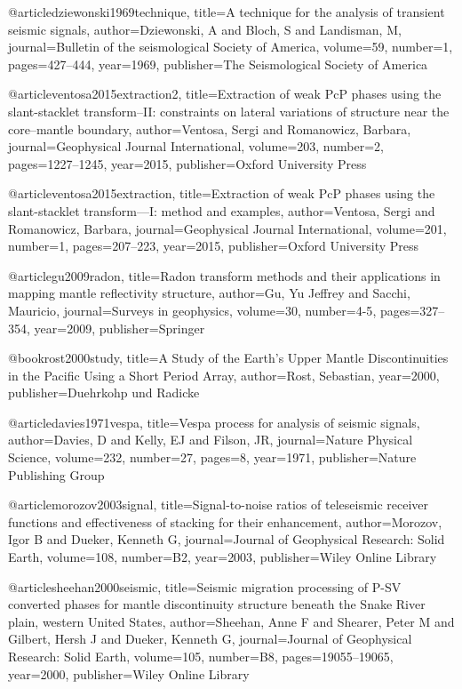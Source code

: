 @article{dziewonski1969technique,
  title={A technique for the analysis of transient seismic signals},
  author={Dziewonski, A and Bloch, S and Landisman, M},
  journal={Bulletin of the seismological Society of America},
  volume={59},
  number={1},
  pages={427--444},
  year={1969},
  publisher={The Seismological Society of America}
}

@article{ventosa2015extraction2,
  title={Extraction of weak PcP phases using the slant-stacklet transform--II: constraints on lateral variations of structure near the core--mantle boundary},
  author={Ventosa, Sergi and Romanowicz, Barbara},
  journal={Geophysical Journal International},
  volume={203},
  number={2},
  pages={1227--1245},
  year={2015},
  publisher={Oxford University Press}
}

@article{ventosa2015extraction,
  title={Extraction of weak PcP phases using the slant-stacklet transform—I: method and examples},
  author={Ventosa, Sergi and Romanowicz, Barbara},
  journal={Geophysical Journal International},
  volume={201},
  number={1},
  pages={207--223},
  year={2015},
  publisher={Oxford University Press}
}

@article{gu2009radon,
  title={Radon transform methods and their applications in mapping mantle reflectivity structure},
  author={Gu, Yu Jeffrey and Sacchi, Mauricio},
  journal={Surveys in geophysics},
  volume={30},
  number={4-5},
  pages={327--354},
  year={2009},
  publisher={Springer}
}


@book{rost2000study,
  title={A Study of the Earth's Upper Mantle Discontinuities in the Pacific Using a Short Period Array},
  author={Rost, Sebastian},
  year={2000},
  publisher={Duehrkohp und Radicke}
}

@article{davies1971vespa,
  title={Vespa process for analysis of seismic signals},
  author={Davies, D and Kelly, EJ and Filson, JR},
  journal={Nature Physical Science},
  volume={232},
  number={27},
  pages={8},
  year={1971},
  publisher={Nature Publishing Group}
}


@article{morozov2003signal,
  title={Signal-to-noise ratios of teleseismic receiver functions and effectiveness of stacking for their enhancement},
  author={Morozov, Igor B and Dueker, Kenneth G},
  journal={Journal of Geophysical Research: Solid Earth},
  volume={108},
  number={B2},
  year={2003},
  publisher={Wiley Online Library}
}

@article{sheehan2000seismic,
  title={Seismic migration processing of P-SV converted phases for mantle discontinuity structure beneath the Snake River plain, western United States},
  author={Sheehan, Anne F and Shearer, Peter M and Gilbert, Hersh J and Dueker, Kenneth G},
  journal={Journal of Geophysical Research: Solid Earth},
  volume={105},
  number={B8},
  pages={19055--19065},
  year={2000},
  publisher={Wiley Online Library}
}


